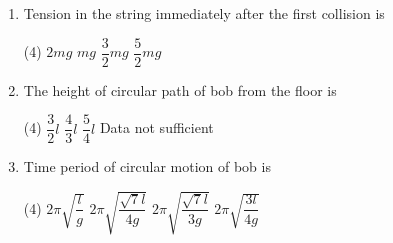 \begin{enumerate}
    \item Tension in the string immediately after the first collision is
        \begin{tasks}(4)
            \task $2mg$
            \task $mg$
            \task $\dfrac{3}{2}mg$\ans
            \task $\dfrac{5}{2}mg$
        \end{tasks}

    \item The height of circular path of bob from the floor is
        \begin{tasks}(4)
            \task $\dfrac{3}{2}l$
            \task $\dfrac{4}{3}l$
            \task $\dfrac{5}{4}l$\ans
            \task Data not sufficient
        \end{tasks}

    \item Time period of circular motion of bob is
        \begin{tasks}(4)
            \task $2\pi\sqrt{\dfrac{l}{g}}$
            \task $2\pi\sqrt{\dfrac{\sqrt{7}l}{4g}}$
            \task $2\pi\sqrt{\dfrac{\sqrt{7}l}{3g}}$
            \task $2\pi\sqrt{\dfrac{3l}{4g}}$\ans
        \end{tasks} 
\end{enumerate}
